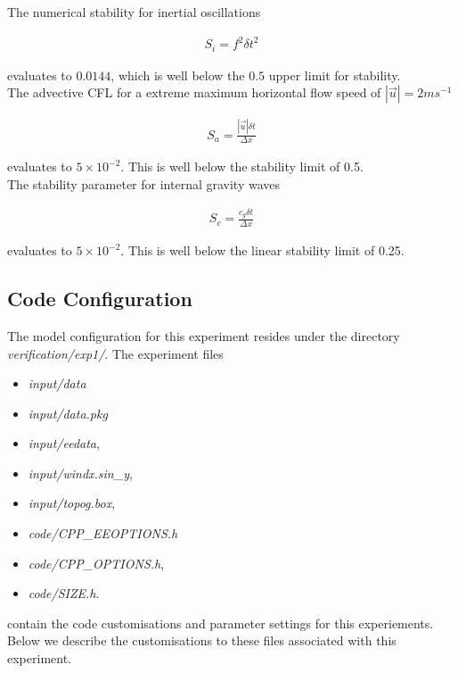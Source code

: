 \noindent The numerical stability for inertial oscillations
\cite{Adcroft_thesis} 

\begin{eqnarray}
\label{EQ:inertial_stability}
S_{i} = f^{2} {\delta t}^2
\end{eqnarray}

\noindent evaluates to $0.0144$, which is well below the $0.5$ upper 
limit for stability.
\\

\noindent The advective CFL \cite{Adcroft_thesis} for a extreme maximum 
horizontal flow
speed of $ | \vec{u} | = 2 ms^{-1}$

\begin{eqnarray}
\label{EQ:cfl_stability}
S_{a} = \frac{| \vec{u} | \delta t}{ \Delta x}
\end{eqnarray}

\noindent evaluates to $5 \times 10^{-2}$. This is well below the stability 
limit of 0.5.
\\

\noindent The stability parameter for internal gravity waves 
\cite{Adcroft_thesis}

\begin{eqnarray}
\label{EQ:igw_stability}
S_{c} = \frac{c_{g} \delta t}{ \Delta x}
\end{eqnarray}

\noindent evaluates to $5 \times 10^{-2}$. This is well below the linear
stability limit of 0.25.
  
\subsection{Code Configuration}
\label{SEC:code_config}

The model configuration for this experiment resides under the 
directory {\it verification/exp1/}.  The experiment files 
\begin{itemize}
\item {\it input/data}
\item {\it input/data.pkg}
\item {\it input/eedata},
\item {\it input/windx.sin\_y},
\item {\it input/topog.box},
\item {\it code/CPP\_EEOPTIONS.h}
\item {\it code/CPP\_OPTIONS.h},
\item {\it code/SIZE.h}. 
\end{itemize}
contain the code customisations and parameter settings for this 
experiements. Below we describe the customisations
to these files associated with this experiment.

